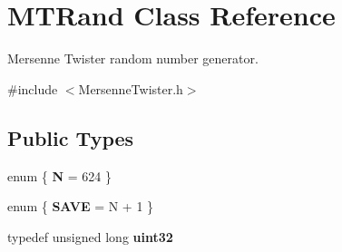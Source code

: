 \hypertarget{class_m_t_rand}{
\section{MTRand Class Reference}
\label{class_m_t_rand}
}


Mersenne Twister random number generator.  




{\ttfamily \#include $<$MersenneTwister.h$>$}

\subsection*{Public Types}
\begin{DoxyCompactItemize}
\item 
enum \{ {\bfseries N} =  624
 \}
\item 
enum \{ {\bfseries SAVE} =  N + 1
 \}
\item 
\hypertarget{class_m_t_rand_a45478edf9e24dcd2a5164bac3889d6a2}{
typedef unsigned long {\bfseries uint32}}
\label{class_m_t_rand_a45478edf9e24dcd2a5164bac3889d6a2}

\end{DoxyCompactItemize}
